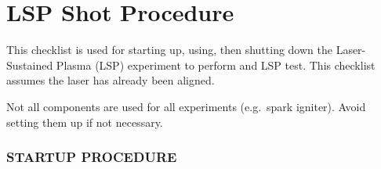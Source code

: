 \section*{LSP Shot Procedure}\label{lsp-shot-procedure}

This checklist is used for starting up, using, then shutting down the
Laser-Sustained Plasma (LSP) experiment to perform and LSP test. This
checklist assumes the laser has already been aligned.

Not all components are used for all experiments (e.g.~spark igniter).
Avoid setting them up if not necessary.

\subsubsection{STARTUP PROCEDURE}\label{startup-procedure}

